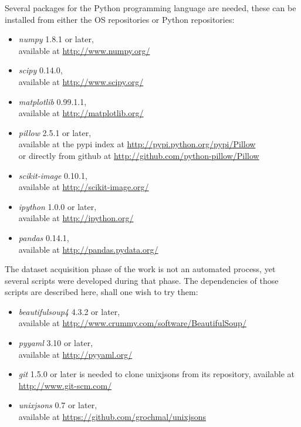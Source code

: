\documentclass[11pt,a4paper,twoside,openright]{report}
\begin{document}
Several packages for the Python programming language are needed, these can be
installed from either the OS repositories or Python repositories:
\begin{itemize}
\item[]\emph{numpy} 1.8.1 or later, \\
available at \href{http://www.numpy.org/}{http://www.numpy.org/}

\item[]\emph{scipy} 0.14.0, \\
available at \href{http://www.scipy.org/}{http://www.scipy.org/}

\item[]\emph{matplotlib} 0.99.1.1, \\
available at \href{http://matplotlib.org/}{http://matplotlib.org/}

\item[]\emph{pillow} 2.5.1 or later, \\
available at the pypi index at
\href{https://pypi.python.org/pypi/Pillow}
{http://pypi.python.org/pypi/Pillow} \\
or directly from github at
\href{http://github.com/python-pillow/Pillow}
{http://github.com/python-pillow/Pillow}

\item[]\emph{scikit-image} 0.10.1, \\
available at \href{http://scikit-image.org/}{http://scikit-image.org/}

\item[]\emph{ipython} 1.0.0 or later, \\
available at \href{http://ipython.org/}{http://ipython.org/}

\item[]\emph{pandas} 0.14.1, \\
available at \href{http://pandas.pydata.org/}{http://pandas.pydata.org/}
\end{itemize}

The dataset acquisition phase of the work is not an automated process, yet
several scripts were developed during that phase.  The dependencies of those
scripts are described here, shall one wish to try them:
\begin{itemize}
\item[]\emph{beautifulsoup4} 4.3.2 or later, \\
available at \href{http://www.crummy.com/software/BeautifulSoup/}
{http://www.crummy.com/software/BeautifulSoup/}

\item[]\emph{pyyaml} 3.10 or later, \\
available at \href{http://pyyaml.org/}{http://pyyaml.org/}

\item[]\emph{git} 1.5.0 or later is needed to clone unixjsons from its
repository, available at \href{http://www.git-scm.com/}{http://www.git-scm.com/}

\item[]\emph{unixjsons} 0.7 or later, \\
available at \href{https://github.com/grochmal/unixjsons}
{https://github.com/grochmal/unixjsons}
\end{itemize}
\end{document}
